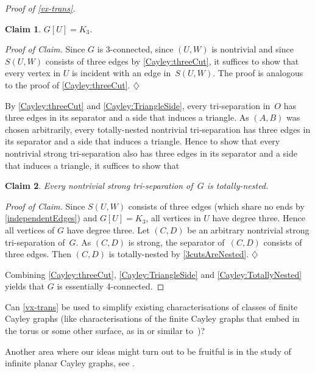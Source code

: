 \documentclass{aic}
\newenvironment{cproof}{\noindent\textit{Proof of Claim.}}{\phantom{!}\!\hfill$\diamondsuit$}
\theoremstyle{plain}
\newtheorem{sublem}{Claim}[thm]
\theoremstyle{definition}
\theoremstyle{plain}
\theoremstyle{plain}
\begin{document}
\begin{proof}[Proof of \autoref{vx-trans}]
\begin{sublem}\label{Cayley:TriangleSide}
$G[U]=K_3$.
\end{sublem}
\begin{cproof}
Since $G$ is 3-connected, since $(U,W)$ is nontrivial and since $S(U,W)$ consists of three edges by \autoref{Cayley:threeCut}, it suffices to show that every vertex in $U$ is incident with an edge in~$S(U,W)$.
The proof is analogous to the proof of \autoref{Cayley:threeCut}.
\end{cproof}\medskip

By \autoref{Cayley:threeCut} and \autoref{Cayley:TriangleSide}, every tri-separation in~$O$ has three edges in its separator and a side that induces a triangle.
As $(A,B)$ was chosen arbitrarily, every totally-nested nontrivial tri-separation has three edges in its separator and a side that induces a triangle.
Hence to show that every nontrivial strong tri-separation also has three edges in its separator and a side that induces a triangle, it suffices to show that

\begin{sublem}\label{Cayley:TotallyNested}
Every nontrivial strong tri-separation of~$G$ is totally-nested.
\end{sublem}
\begin{cproof}
Since $S(U,W)$ consists of three edges (which share no ends by \autoref{independentEdges}) and $G[U]=K_3$, all vertices in $U$ have degree three.
Hence all vertices of $G$ have degree three.
Let $(C,D)$ be an arbitrary nontrivial strong tri-separation of~$G$.
As $(C,D)$ is strong, the separator of~$(C,D)$ consists of three edges.
Then $(C,D)$ is totally-nested by \autoref{3cutsAreNested}.
\end{cproof}\medskip

Combining \autoref{Cayley:threeCut}, \autoref{Cayley:TriangleSide} and \autoref{Cayley:TotallyNested} yields that $G$ is essentially 4-connected.
\end{proof}

\begin{oprob}
Can \autoref{vx-trans} be used to simplify existing characterisations of classes of finite Cayley graphs (like characterisations of the finite Cayley graphs that embed in the torus or some other surface, as in or similar to~\cite{Proulx,Tucker1,Tucker2})?
\end{oprob}

Another area where our ideas might turn out to be fruitful is in the study of infinite planar Cayley graphs, see \cite{Geo_plane_cubic,georgakopoulos2020planar,georgakopoulos2019planarI,georgakopoulos2023planarII}.
\end{document}
